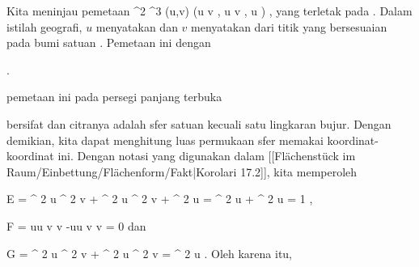 {

Kita meninjau pemetaan
\maabbeledisp {\varphi} {\R^2} {\R^3
} {(u,v)} {(\cos  u \cos  v  , \cos  u \sin  v  , \sin  u )
} {,}
yang
terletak pada  {.} Dalam istilah geografi, $u$ menyatakan  {} dan $v$ menyatakan  {} dari titik yang bersesuaian pada bumi satuan
 {} {.}
Pemetaan ini
dengan

 { . }

pemetaan ini pada persegi panjang terbuka

\mathdisp {{]{- { \frac{   \pi }{  2 } }}, { \frac{   \pi }{  2 } } [} \times {]{-\pi}, \pi[}} {  }

bersifat
dan citranya adalah sfer satuan kecuali satu lingkaran bujur. Dengan demikian, kita dapat menghitung luas permukaan sfer memakai koordinat-koordinat ini. Dengan notasi yang digunakan dalam
[[Flächenstück im Raum/Einbettung/Flächenform/Fakt|Korolari 17.2]],
kita memperoleh

\mavergleichskettedisp
{\vergleichskette
{E
}
{ =} { \sin^{ 2  }  u \cos^{ 2  }  v + \sin^{ 2  }  u \sin^{ 2  }  v + \cos^{ 2  }  u
}
{ =} { \sin^{ 2  }  u + \cos^{ 2  }  u
}
{ =} { 1
}
{ } {
}
}
{}{}{,}

\mavergleichskettedisp
{\vergleichskette
{F
}
{ =} { \sin  u\cos  u \sin  v \cos  v  -\sin  u\cos  u \sin  v \cos  v
}
{ =} { 0
}
{ } {
}
{ } {
}
}
{}{}{}
dan

\mavergleichskettedisp
{\vergleichskette
{G
}
{ =} { \cos^{ 2  }  u \sin^{ 2  }  v + \cos^{ 2  }  u \cos^{ 2  }  v
}
{ =} { \cos^{ 2  }  u
}
{ } {
}
{ } {
}
}
{}{}{.}
Oleh karena itu,

}
